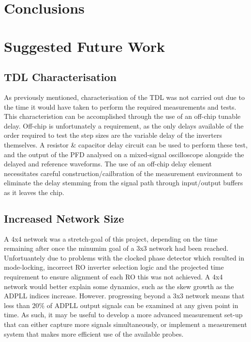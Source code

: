 \section{Conclusions}
\section{Suggested Future Work}
\subsection{\acl{TDL} Characterisation}
As previously mentioned, characterisation of the \ac{TDL} was not carried out due to the time it would have taken to perform the required measurements and tests. This characteristion can be accomplished through the use of an off-chip tunable delay. Off-chip is unfortunately a requirement, as the only delays available of the order required to test the step sizes are the variable delay of the inverters themselves. A resistor \& capacitor delay circuit can be used to perform these test, and the output of the \ac{PFD} analysed on a mixed-signal oscilloscope alongside the delayed and reference waveforms. The use of an off-chip delay element necessitates careful construction/cailbration of the measurement environment to eliminate the delay stemming from the signal path through input/output buffers as it leaves the chip.

\subsection{Increased Network Size}
A 4x4 network was a stretch-goal of this project, depending on the time remaining after once the minumim goal of a 3x3 network had been reached. Unfortuantely due to problems with the clocked phase detector which resulted in mode-locking, incorrect \ac{RO} inverter selection logic and the projected time requirement to ensure alignment of each \ac{RO} this was not achieved. A 4x4 network would better explain some dynamics, such as the skew growth as the \ac{ADPLL} indices increase. However. progressing beyond a 3x3 network means that less than $20\%$ of \ac{ADPLL} output signals can be examined at any given point in time. As such, it may be useful to develop a more advanced measurement set-up that can either capture more signals simultaneously, or implement a measurement system that makes more efficient use of the available probes.

